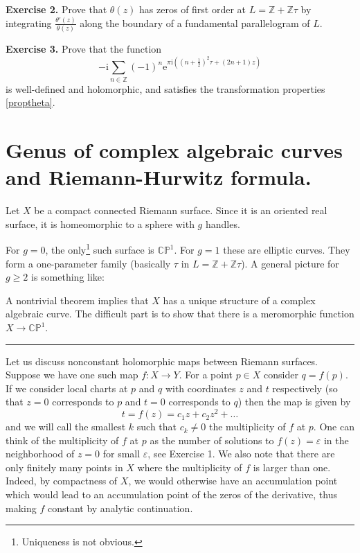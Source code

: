 \documentclass[11pt]{article}
\numberwithin{equation}{section}
\numberwithin{footnote}{section}
\newcommand{\blue}{\color{blue}}
\newcommand{\ee}{{\mathrm e}}
\newcommand{\ii}{{\mathrm i}}
\renewcommand{\P}{{\mathbb P}}
\newcommand{\Z}{{\mathbb Z}}
\newcommand{\C}{{\mathbb C}}
\begin{document}
{\bf Exercise 2.} Prove that $\theta(z)$ has zeros of first order at $L=\Z+\Z\tau$ by integrating $\frac {\theta'(z)}{\theta(z)}$ along the boundary of a fundamental parallelogram of $L$.

{\bf Exercise 3.} Prove that the function
$$
 -\ii \sum_{n\in\Z} (-1)^{n} \ee^{\pi\ii((n+\frac 12)^2 \tau + (2n+1)z)}
$$
is well-defined and holomorphic, and satisfies the transformation properties \eqref{proptheta}.

\section{Genus of complex algebraic curves and Riemann-Hurwitz formula.}\label{sec.RH}

Let $X$ be a compact connected Riemann surface. 
Since it is an oriented real surface, it is homeomorphic to a sphere with $g$ handles.

\smallskip
For $g=0$, the only\footnote{ Uniqueness is not obvious.} such surface is $\C\P^1$. For $g=1$ these are elliptic curves. They form a one-parameter family (basically $\tau$ in $L=\Z+\Z\tau$). A general picture for $g\geq 2$ is something like:


\noindent
A nontrivial theorem implies that $X$ has a unique structure of a complex algebraic curve. The difficult part is to show that there is a meromorphic function $X\to \C\P^1$.

\smallskip
{\blue \hrule}
Let us discuss {\blue nonconstant} holomorphic maps between Riemann surfaces. Suppose we have one such map $f:X\to Y$. For a point $p\in X$ consider $q=f(p)$. If we consider local charts at $p$ and $q$ with coordinates $z$ and $t$ respectively (so that $z=0$ corresponds to $p$ and $t=0$ corresponds to $q$) then the map is given by
$$
t=f(z) = c_1 z + c_2 z^2 + \ldots
$$
and we will call the smallest $k$ such that $c_k\neq 0$ the {\blue multiplicity} of $f$ at $p$. One can think of the multiplicity of $f$ at $p$ as the number of solutions to $f(z) = \varepsilon$ in the neighborhood of $z=0$ for small $\varepsilon$, see Exercise 1.
We also note that there are only finitely many points in $X$ where the multiplicity of $f$ is larger than one. Indeed, by compactness of $X$, we would otherwise have an accumulation point which would lead to an accumulation point of the zeros of the derivative, thus making $f$ constant by analytic continuation.
\end{document}

